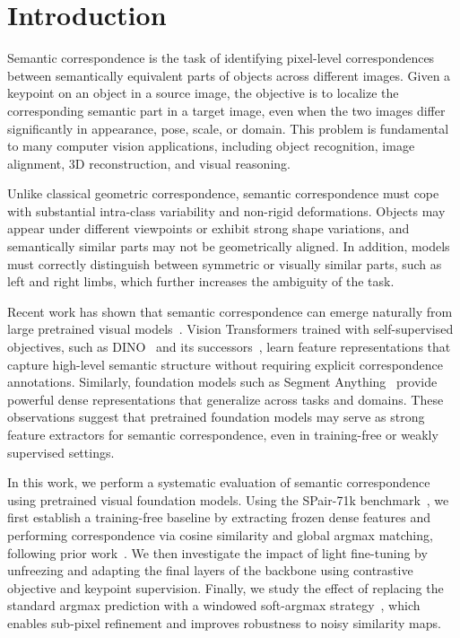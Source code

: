 \section{Introduction}
\label{sec:intro}

Semantic correspondence is the task of identifying pixel-level correspondences between semantically equivalent parts of objects across different
images. Given a keypoint on an object in a source image, the objective is to localize the corresponding semantic part in a target image,
even when the two images differ significantly in appearance, pose, scale, or domain. This problem is fundamental to many computer vision applications,
including object recognition, image alignment, 3D reconstruction, and visual reasoning.

Unlike classical geometric correspondence, semantic correspondence must cope with substantial intra-class variability and non-rigid deformations.
Objects may appear under different viewpoints or exhibit strong shape variations, and semantically similar parts may not be geometrically aligned.
In addition, models must correctly distinguish between symmetric or visually similar parts, such as left and right limbs, which further increases
the ambiguity of the task.

Recent work has shown that semantic correspondence can emerge naturally from large pretrained visual models~\cite{tang2023emergent, zhang2023tale, zhang2024telling}.
Vision Transformers trained with self-supervised objectives, such as DINO~\cite{caron2021emerging} and its successors~\cite{oquab2023dinov2, simeoni2025dinov3},
learn feature representations that capture high-level semantic structure without requiring explicit correspondence annotations.
Similarly, foundation models such as Segment Anything~\cite{kirillov2023segment} provide powerful dense representations that generalize across tasks
and domains. These observations suggest that pretrained foundation models may serve as strong feature extractors for semantic correspondence,
even in training-free or weakly supervised settings.

In this work, we perform a systematic evaluation of semantic correspondence using pretrained visual foundation models. Using the SPair-71k benchmark~\cite{min2019spair},
we first establish a training-free baseline by extracting frozen dense features and performing correspondence via cosine similarity and global argmax
matching, following prior work~\cite{tang2023emergent}. We then investigate the impact of light fine-tuning by unfreezing and adapting the final layers
of the backbone using contrastive objective and keypoint supervision. Finally, we study the effect of replacing the standard argmax prediction with
a windowed soft-argmax strategy~\cite{zhang2024telling}, which enables sub-pixel refinement and improves robustness to noisy similarity maps.

